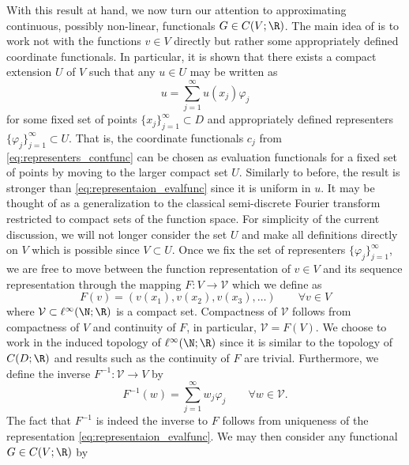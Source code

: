 {With this result at hand, we now turn our attention to approximating continuous, possibly non-linear, functionals \(G \in C(V;\R)\).
The main idea of \cite{chen1995universal} is to work not with the functions \(v \in V\) directly but rather
some appropriately defined coordinate functionals. In particular, it is shown that there exists a compact extension
\(U\) of \(V\) such that any \(u \in U\) may be written as
\begin{equation}
\label{eq:representaion_evalfunc}
u = \sum_{j=1}^\infty u(x_j) \varphi_j
\end{equation}
for some fixed set of points \(\{x_j\}_{j=1}^\infty \subset D\) and appropriately defined representers \(\{\varphi_j\}_{j=1}^\infty \subset U\).
That is, the coordinate functionals \(c_j\) from \eqref{eq:representers_contfunc} can be chosen as evaluation functionals 
for a fixed set of points by moving to the larger compact set \(U\). Similarly to before, the result 
is stronger than \eqref{eq:representaion_evalfunc} since it is uniform in \(u\). It may be thought of 
as a generalization to the classical semi-discrete Fourier transform restricted to compact sets of the function space.
For simplicity of the current discussion, we will not longer consider the set \(U\) and make all definitions 
directly on \(V\) which is possible since \(V \subset U\). Once we fix the set of representers \(\{\varphi_j\}_{j=1}^\infty\),
we are free to move between the function representation of \(v \in V\) and its sequence
representation through the mapping \(F: V \to \mathcal{V}\) which we define as
\begin{equation}
F(v) = (v(x_1), v(x_2), v(x_3), \dots) \qquad \forall v \in V
\end{equation}
where \(\mathcal{V} \subset \ell^\infty(\N;\R)\) is a compact set. Compactness of \(\mathcal{V}\) follows from compactness of \(V\)
and continuity of \(F\), in particular, \(\mathcal{V} = F(V)\). We choose to work in the induced topology of \(\ell^\infty(\N;\R)\)
since it is similar to the topology of \(C(D;\R)\) and results such as the continuity of \(F\) are trivial. 
Furthermore, we define the inverse \(F^{-1} : \mathcal{V} \to V\) by
\begin{equation}
F^{-1}(w) = \sum_{j=1}^\infty w_j \varphi_j \qquad \forall w \in \mathcal{V}.
\end{equation}
The fact that \(F^{-1}\) is indeed the inverse to \(F\) follows from uniqueness of the representation \eqref{eq:representaion_evalfunc}.
We may then consider any functional \(G \in C(V;\R)\) by 
\begin{equation}

\end{equation}}
